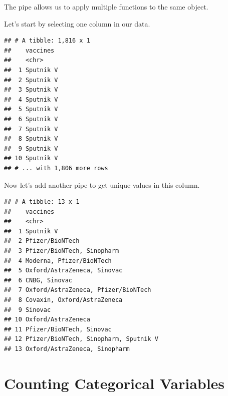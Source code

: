 \documentclass[
]{book}
\newenvironment{Shaded}{\begin{snugshade}}{\end{snugshade}}
\newcommand{\KeywordTok}[1]{\textcolor[rgb]{0.13,0.29,0.53}{\textbf{#1}}}
\newcommand{\NormalTok}[1]{#1}
\newcommand{\OperatorTok}[1]{\textcolor[rgb]{0.81,0.36,0.00}{\textbf{#1}}}
\newcommand{\StringTok}[1]{\textcolor[rgb]{0.31,0.60,0.02}{#1}}
\begin{document}
The pipe allows us to apply multiple functions to the same object.

Let's start by selecting one column in our data.

\begin{Shaded}
\end{Shaded}

\begin{verbatim}
## # A tibble: 1,816 x 1
##    vaccines 
##    <chr>    
##  1 Sputnik V
##  2 Sputnik V
##  3 Sputnik V
##  4 Sputnik V
##  5 Sputnik V
##  6 Sputnik V
##  7 Sputnik V
##  8 Sputnik V
##  9 Sputnik V
## 10 Sputnik V
## # ... with 1,806 more rows
\end{verbatim}

Now let's add another pipe to get unique values in this column.

\begin{Shaded}
\end{Shaded}

\begin{verbatim}
## # A tibble: 13 x 1
##    vaccines                             
##    <chr>                                
##  1 Sputnik V                            
##  2 Pfizer/BioNTech                      
##  3 Pfizer/BioNTech, Sinopharm           
##  4 Moderna, Pfizer/BioNTech             
##  5 Oxford/AstraZeneca, Sinovac          
##  6 CNBG, Sinovac                        
##  7 Oxford/AstraZeneca, Pfizer/BioNTech  
##  8 Covaxin, Oxford/AstraZeneca          
##  9 Sinovac                              
## 10 Oxford/AstraZeneca                   
## 11 Pfizer/BioNTech, Sinovac             
## 12 Pfizer/BioNTech, Sinopharm, Sputnik V
## 13 Oxford/AstraZeneca, Sinopharm
\end{verbatim}

\hypertarget{counting-categorical-variables}{%
\section{Counting Categorical Variables}\label{counting-categorical-variables}}
\end{document}
